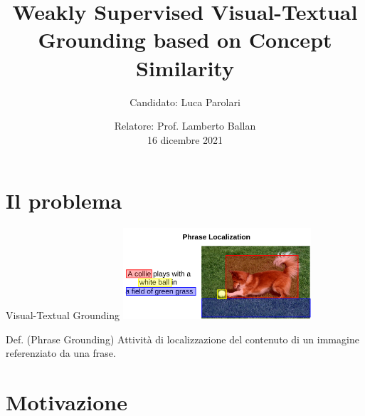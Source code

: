\documentclass{beamer}
\title{Weakly Supervised Visual-Textual Grounding based on Concept Similarity}
\author{Candidato: Luca Parolari}
\date{Relatore: Prof. Lamberto Ballan \\ \vspace{0.2cm} \small 16 dicembre 2021}
\begin{document}
\maketitle


\section{Il problema}

\begin{frame}{Visual-Textual Grounding}
  \centering
  \includegraphics[width=7cm]{images/dog-playing-with-ball.png}

  \vspace{0.5cm}

  \begin{alertblock}{Def. (Phrase Grounding)}
    Attività di localizzazione del contenuto di un immagine referenziato da una
    frase.
  \end{alertblock}
\end{frame}

\section{Motivazione}
\end{document}
